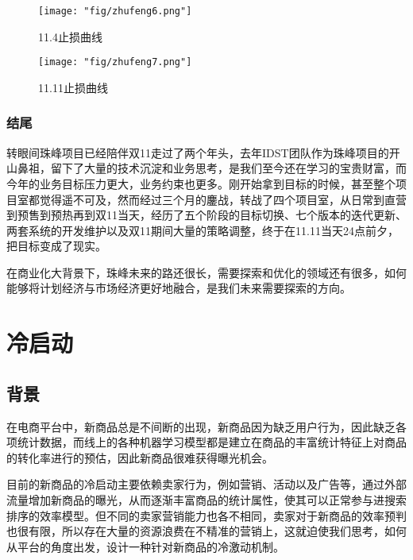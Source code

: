 \begin{figure}[!h]
	\centering
	\texttt{[image: "fig/zhufeng6.png"]}
	\caption{11.4止损曲线}
	\label{fig:zhufeng6}
\end{figure}

\begin{figure}[!h]
	\centering
	\texttt{[image: "fig/zhufeng7.png"]}
	\caption{11.11止损曲线}
	\label{fig:zhufeng7}
\end{figure}

\subsubsection{结尾}
转眼间珠峰项目已经陪伴双11走过了两个年头，去年IDST团队作为珠峰项目的开山鼻祖，留下了大量的技术沉淀和业务思考，是我们至今还在学习的宝贵财富，而今年的业务目标压力更大，业务约束也更多。刚开始拿到目标的时候，甚至整个项目室都觉得遥不可及，然而经过三个月的鏖战，转战了四个项目室，从日常到直营到预售到预热再到双11当天，经历了五个阶段的目标切换、七个版本的迭代更新、两套系统的开发维护以及双11期间大量的策略调整，终于在11.11当天24点前夕，把目标变成了现实。

在商业化大背景下，珠峰未来的路还很长，需要探索和优化的领域还有很多，如何能够将计划经济与市场经济更好地融合，是我们未来需要探索的方向。



\section{冷启动}
\subsection{背景}
在电商平台中，新商品总是不间断的出现，新商品因为缺乏用户行为，因此缺乏各项统计数据，而线上的各种机器学习模型都是建立在商品的丰富统计特征上对商品的转化率进行的预估，因此新商品很难获得曝光机会。


目前的新商品的冷启动主要依赖卖家行为，例如营销、活动以及广告等，通过外部流量增加新商品的曝光，从而逐渐丰富商品的统计属性，使其可以正常参与进搜索排序的效率模型。但不同的卖家营销能力也各不相同，卖家对于新商品的效率预判也很有限，所以存在大量的资源浪费在不精准的营销上，这就迫使我们思考，如何从平台的角度出发，设计一种针对新商品的冷激动机制。

